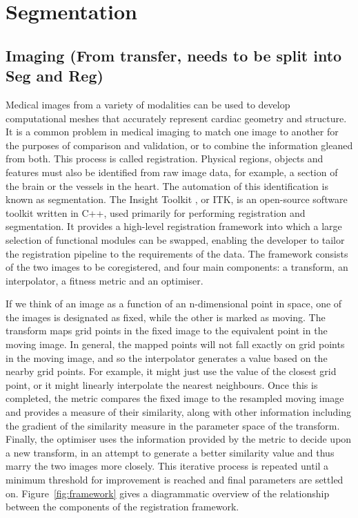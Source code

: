 \section{Segmentation}
\subsection{Imaging (From transfer, needs to be split into Seg and Reg)}
\label{imaging}
Medical images from a variety of modalities can be used to develop computational meshes that accurately represent cardiac geometry and structure. It is a common problem in medical imaging to match one image to another for the purposes of comparison and validation, or to combine the information gleaned from both. This process is called registration. Physical regions, objects and features must also be identified from raw image data, for example, a section of the brain or the vessels in the heart. The automation of this identification is known as segmentation. The Insight Toolkit \cite{Yoo2002}, or ITK, is an open-source software toolkit written in C++, used primarily for performing registration and segmentation. It provides a high-level registration framework into which a large selection of functional modules can be swapped, enabling the developer to tailor the registration pipeline to the requirements of the data. The framework consists of the two images to be coregistered, and four main components: a transform, an interpolator, a fitness metric and an optimiser.

If we think of an image as a function of an n-dimensional point in space, one of the images is designated as fixed, while the other is marked as moving. The transform maps grid points in the fixed image to the equivalent point in the moving image. In general, the mapped points will not fall exactly on grid points in the moving image, and so the interpolator generates a value based on the nearby grid points. For example, it might just use the value of the closest grid point, or it might linearly interpolate the nearest neighbours. Once this is completed, the metric compares the fixed image to the resampled moving image and provides a measure of their similarity, along with other information including the gradient of the similarity measure in the parameter space of the transform. Finally, the optimiser uses the information provided by the metric to decide upon a new transform, in an attempt to generate a better similarity value and thus marry the two images more closely. This iterative process is repeated until a minimum threshold for improvement is reached and final parameters are settled on. Figure~\ref{fig:framework} gives a diagrammatic overview of the relationship between the components of the registration framework.

